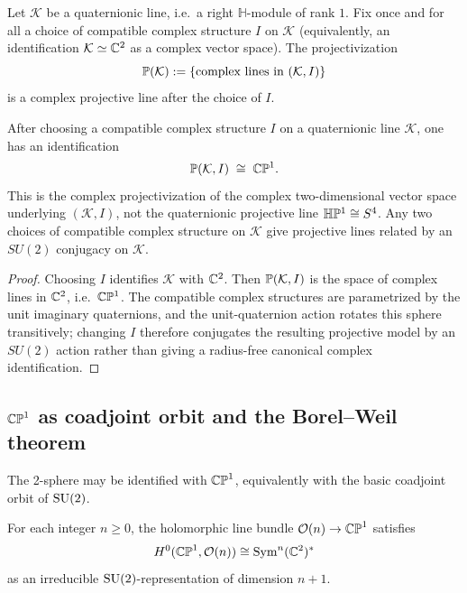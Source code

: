 \documentclass[11pt]{article}
\begin{document}
Let $\mathcal K$ be a quaternionic line, i.e.\ a right $\mathbb H$-module of rank $1$. Fix once and for all
a choice of compatible complex structure $I$ on $\mathcal K$ (equivalently, an identification
$\mathcal K\simeq \mathbb{C}^2$ as a complex vector space). The projectivization
\[
\mathbb{P}(\mathcal K):=\{\text{complex lines in }(\mathcal K,I)\}
\]
is a complex projective line after the choice of $I$.

\begin{theorem}
\label{p1:thm:quat-projline}
After choosing a compatible complex structure $I$ on a quaternionic line
$\mathcal K$, one has an identification
\[
\mathbb{P}(\mathcal K,I)\;\cong\;\mathbb{C}\mathbb{P}^1.
\]
This is the complex projectivization of the complex two-dimensional vector space
underlying \((\mathcal K,I)\), not the quaternionic projective line
\(\mathbb H\mathbb{P}^1\cong S^4\).  Any two choices of compatible complex structure on
$\mathcal K$ give projective lines related by an $SU(2)$ conjugacy on $\mathcal K$.
\end{theorem}

\begin{proof}
Choosing $I$ identifies $\mathcal K$ with $\mathbb{C}^2$. Then $\mathbb{P}(\mathcal K,I)$ is
the space of complex lines in $\mathbb{C}^2$, i.e.\ $\mathbb{C}\mathbb{P}^1$. The compatible complex
structures are parametrized by the unit imaginary quaternions, and the
unit-quaternion action rotates this sphere transitively; changing $I$ therefore
conjugates the resulting projective model by an $SU(2)$ action rather than giving
a radius-free canonical complex identification.
\end{proof}

\subsection{\texorpdfstring{\(\mathbb{CP}^1\)}{CP1} as coadjoint orbit and the Borel--Weil theorem}
\label{p1:subsec:borel-weil}

The 2-sphere may be identified with \(\mathbb{CP}^1\), equivalently with the basic
coadjoint orbit of \(\mathrm{SU}(2)\).

\begin{theorem}
\label{p1:thm:borel-weil-cp1}
For each integer \(n\ge 0\), the holomorphic line bundle \(\mathcal O(n)\to \mathbb{CP}^1\)
satisfies
\[
H^0(\mathbb{CP}^1,\mathcal O(n))\cong \operatorname{Sym}^n(\mathbb{C}^2)^\ast
\]
as an irreducible \(\mathrm{SU}(2)\)-representation of dimension \(n+1\).
\end{theorem}
\end{document}
